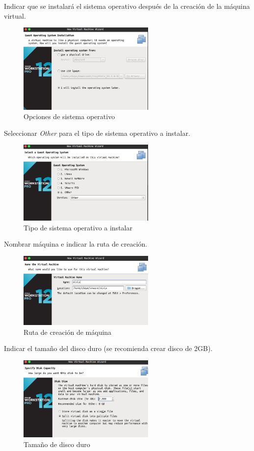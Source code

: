 \documentclass[12pt]{article}
\begin{document}
Indicar que se instalará el sistema operativo después de la creación de la máquina virtual.
\begin{figure}[H]
  \centering
  \includegraphics[width=0.6\textwidth]{vm/min02.png}
  \caption{Opciones de sistema operativo}
\end{figure}

Seleccionar \textit{Other} para el tipo de sistema operativo a instalar.
\begin{figure}[H]
  \centering
  \includegraphics[width=0.6\textwidth]{vm/min03.png}
  \caption{Tipo de sistema operativo a instalar}
\end{figure}

Nombrar máquina e indicar la ruta de creación.
\begin{figure}[H]
  \centering
  \includegraphics[width=0.6\textwidth]{vm/min04.png}
  \caption{Ruta de creación de máquina}
\end{figure}

Indicar el tamaño del disco duro (se recomienda crear disco de 2GB).
\begin{figure}[H]
  \centering
  \includegraphics[width=0.6\textwidth]{vm/min05.png}
  \caption{Tamaño de disco duro}
\end{figure}
\end{document}
